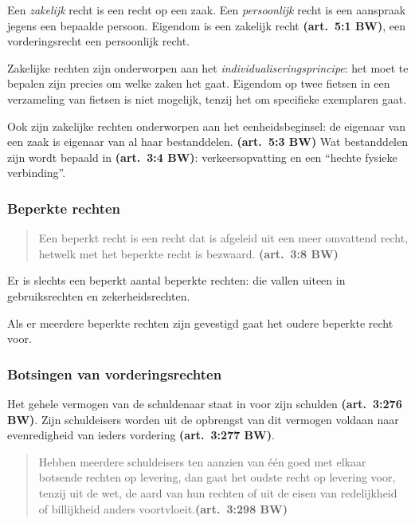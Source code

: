 \documentclass[a4paper]{article}
\newcommand{\art}[1]{\textbf{(art.~#1 BW)}\xspace}
\begin{document}
Een \emph{zakelijk} recht is een recht op een zaak. Een \emph{persoonlijk}
recht is een aanspraak jegens een bepaalde persoon. Eigendom is een zakelijk
recht \art{5:1}, een vorderingsrecht een persoonlijk recht.

Zakelijke rechten zijn onderworpen aan het \emph{individualiseringsprincipe}:
het moet te bepalen zijn precies om welke zaken het gaat. Eigendom op twee
fietsen in een verzameling van fietsen is niet mogelijk, tenzij het om
specifieke exemplaren gaat.

Ook zijn zakelijke rechten onderworpen aan het eenheidsbeginsel: de eigenaar
van een zaak is eigenaar van al haar bestanddelen. \art{5:3} Wat bestanddelen
zijn wordt bepaald in \art{3:4}: verkeersopvatting en een ``hechte fysieke
verbinding''.

\subsubsection{Beperkte rechten}

\begin{quote}

  Een beperkt recht is een recht dat is afgeleid uit een meer omvattend recht,
  hetwelk met het beperkte recht is bezwaard. \art{3:8}

\end{quote}

Er is slechts een beperkt aantal beperkte rechten: die vallen uiteen in
gebruiksrechten en zekerheidsrechten.

Als er meerdere beperkte rechten zijn gevestigd gaat het oudere beperkte recht
voor.

\subsubsection{Botsingen van vorderingsrechten}

Het gehele vermogen van de schuldenaar staat in voor zijn schulden
\art{3:276}. Zijn schuldeisers worden uit de opbrengst van dit vermogen
voldaan naar evenredigheid van ieders vordering \art{3:277}.

\begin{quote}

  Hebben meerdere schuldeisers ten aanzien van \'e\'en goed met elkaar
  botsende rechten op levering, dan gaat het oudste recht op levering voor,
  tenzij uit de wet, de aard van hun rechten of uit de eisen van redelijkheid
  of billijkheid anders voortvloeit.\art{3:298}

\end{quote}
\end{document}

